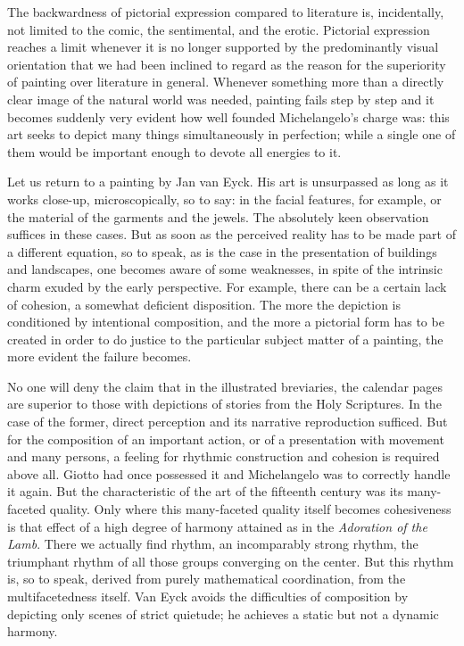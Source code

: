 The backwardness of pictorial expression compared to literature is,
incidentally, not limited to the comic, the sentimental, and the erotic.
Pictorial expression reaches a limit whenever it is no longer supported
by the predominantly visual orientation that we had been inclined to
regard as the reason for the superiority of painting over literature in
general. Whenever something more than a directly clear image of the
natural world was needed, painting fails step by step and it becomes
suddenly very evident how well founded Michelangelo's charge was: this
art seeks to depict many things simultaneously in perfection; while a
single one of them would be important enough to devote all energies to
it.

Let us return to a painting by Jan van Eyck. His art is unsurpassed as
long as it works close-up, microscopically, so to say: in the facial
features, for example, or the material of the garments and the jewels.
The absolutely keen observation suffices in these cases. But as soon as
the perceived reality has to be made part of a different equation, so to
speak, as is the case in the presentation of buildings and landscapes,
one becomes aware of some weaknesses, in spite of the intrinsic charm
exuded by the early perspective. For example, there can be a certain
lack of cohesion, a somewhat deficient disposition. The more the
depiction is conditioned by intentional composition, and the more a
pictorial form has to be created in order to do justice to the
particular subject matter of a painting, the more evident the failure
becomes.

No one will deny the claim that in the illustrated breviaries, the
calendar pages are superior to those with depictions of stories from the
Holy Scriptures. In the case of the former, direct perception and its
narrative reproduction sufficed. But for the composition of an important
action, or of a presentation with movement and many persons, a feeling
for rhythmic construction and cohesion is required above all. Giotto had
once possessed it and Michelangelo was to correctly handle it again. But
the characteristic of the art of the fifteenth century was its
many-faceted quality. Only where this many-faceted quality itself
becomes cohesiveness is that effect of a
\protect\hypertarget{21_Chapter_Thirteen__IMAGE_AND_WORD.xhtmlux5cux23page_376}{}{}high
degree of harmony attained as in the \emph{Adoration of the Lamb}. There
we actually find rhythm, an incomparably strong rhythm, the triumphant
rhythm of all those groups converging on the center. But this rhythm is,
so to speak, derived from purely mathematical coordination, from the
multifacetedness itself. Van Eyck avoids the difficulties of composition
by depicting only scenes of strict quietude; he achieves a static but
not a dynamic harmony.

